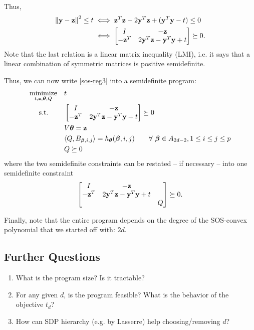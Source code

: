 \documentclass[11pt]{article}
\begin{document}
Thus,
\begin{align*}
\left\lVert {\bf y}-{\bf z} \right\rVert^2 \leq t &\iff {\bf z}^T{\bf z} - 2{\bf y}^T{\bf z} + ({\bf y}^T{\bf y} - t) \leq 0 \\
&\iff \begin{bmatrix} I & -{\bf z} \\ -{\bf z}^T & 2{\bf y}^T{\bf z} - {\bf y}^T{\bf y} + t \end{bmatrix} \succeq 0.
\end{align*}
Note that the last relation is a linear matrix inequality (LMI), i.e. it says that a linear combination of symmetric matrices is positive semidefinite. 

Thus, we can now write \eqref{sos-reg3} into a semidefinite program:
\begin{equation}\label{sos-reg4}
\begin{aligned}
& \underset{t, {\bf z}, {\boldsymbol\theta}, Q}{\text{minimize}}
& & t \\
& \text{\quad\ s.t.}
& & \begin{bmatrix} I & -{\bf z} \\ -{\bf z}^T & 2{\bf y}^T{\bf z} - {\bf y}^T{\bf y} + t \end{bmatrix} \succeq 0 \\
& & & V{\boldsymbol\theta} = {\bf z} \\
& & & \langle{Q, B_{{\boldsymbol\beta}, i, j}} \rangle = h_{\boldsymbol\theta}({\boldsymbol\beta}, i, j) \qquad \forall\ {\boldsymbol\beta} \in A_{2d - 2}, 1 \le i \le j \le p \\
& & & Q \succeq 0 
\end{aligned}
\end{equation}
where the two semidefinite constraints can be restated -- if necessary -- into one semidefinite constraint
\[
\begin{bmatrix} I & -{\bf z} &  \\ -{\bf z}^T & 2{\bf y}^T{\bf z} - {\bf y}^T{\bf y} + t & \\ & & Q \end{bmatrix} \succeq 0.
\]

Finally, note that the entire program depends on the degree of the SOS-convex polynomial that we started off with: $2d$. 

\subsection*{Further Questions}

\begin{enumerate}
\item What is the program size? Is it tractable?
\item For any given $d$, is the program feasible? What is the behavior of the objective $t_d$?
\item How can SDP hierarchy (e.g. by Lasserre) help choosing/removing $d$?
\end{enumerate}
\end{document}
